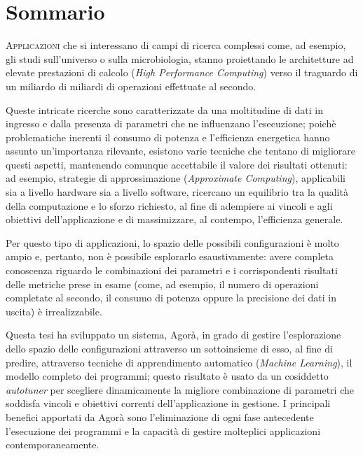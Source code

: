 \chapter*{Sommario}

\lettrine{A}{pplicazioni} che si interessano di campi di ricerca complessi come, ad esempio, gli studi sull'universo o sulla microbiologia, stanno proiettando le architetture ad elevate prestazioni di calcolo (\textit{High Performance Computing}) verso il traguardo di un miliardo di miliardi di operazioni effettuate al secondo.

Queste intricate ricerche sono caratterizzate da una moltitudine di dati in ingresso e dalla presenza di parametri che ne influenzano l'esecuzione; poichè problematiche inerenti il consumo di potenza e l'efficienza energetica hanno assunto un'importanza rilevante, esistono varie tecniche che tentano di migliorare questi aspetti, mantenendo comunque accettabile il valore dei risultati ottenuti: ad esempio, strategie di approssimazione (\textit{Approximate Computing}), applicabili sia a livello hardware sia a livello software, ricercano un equilibrio tra la qualità della computazione e lo sforzo richiesto, al fine di adempiere ai vincoli e agli obiettivi dell'applicazione e di massimizzare, al contempo, l'efficienza generale.

Per questo tipo di applicazioni, lo spazio delle possibili configurazioni è molto ampio e, pertanto, non è possibile esplorarlo esaustivamente: avere completa conoscenza riguardo le combinazioni dei parametri e i corrispondenti risultati delle metriche prese in esame (come, ad esempio, il numero di operazioni completate al secondo, il consumo di potenza oppure la precisione dei dati in uscita) è irrealizzabile.

Questa tesi ha sviluppato un sistema, Agorà, in grado di gestire l'esplorazione dello spazio delle configurazioni attraverso un sottoinsieme di esso, al fine di predire, attraverso tecniche di apprendimento automatico (\textit{Machine Learning}), il modello completo dei programmi; questo risultato è usato da un cosiddetto \textit{autotuner} per scegliere dinamicamente la migliore combinazione di parametri che soddisfa vincoli e obiettivi correnti dell'applicazione in gestione. I principali benefici apportati da Agorà sono l'eliminazione di ogni fase antecedente l'esecuzione dei programmi e la capacità di gestire molteplici applicazioni contemporaneamente.
